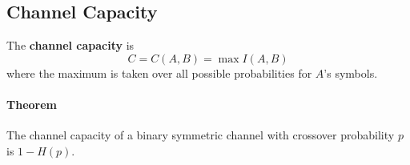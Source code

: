 \subsection{Channel Capacity}
The \textbf{channel capacity} is
\[C = C(A, B) = \max I(A, B)\]
where the maximum is taken over all possible probabilities for \(A\)'s symbols.

\paragraph{Theorem}
The channel capacity of a binary symmetric channel with crossover probability  \(p\) is \(1 - H(p)\).

\newpage